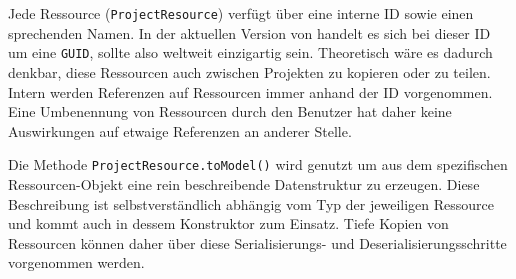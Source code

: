 Jede Ressource (\texttt{ProjectResource}) verfügt über eine interne ID sowie einen sprechenden Namen. In der aktuellen Version von \idename{} handelt es sich bei dieser ID um eine \lstinline{GUID}, sollte also weltweit einzigartig sein. Theoretisch wäre es dadurch denkbar, diese Ressourcen auch zwischen Projekten zu kopieren oder zu teilen. Intern werden Referenzen auf Ressourcen immer anhand der ID vorgenommen. Eine Umbenennung von Ressourcen durch den Benutzer hat daher keine Auswirkungen auf etwaige Referenzen an anderer Stelle.

Die Methode \texttt{ProjectResource.toModel()} wird genutzt um aus dem spezifischen Res\-sour\-cen-Objekt eine rein beschreibende Datenstruktur zu erzeugen. Diese Beschreibung ist selbstverständlich abhängig vom Typ der jeweiligen Ressource und kommt auch in dessem Konstruktor zum Einsatz. Tiefe Kopien von Ressourcen können daher über diese Se\-ria\-lisierungs- und Deserialisierungsschritte vorgenommen werden.

